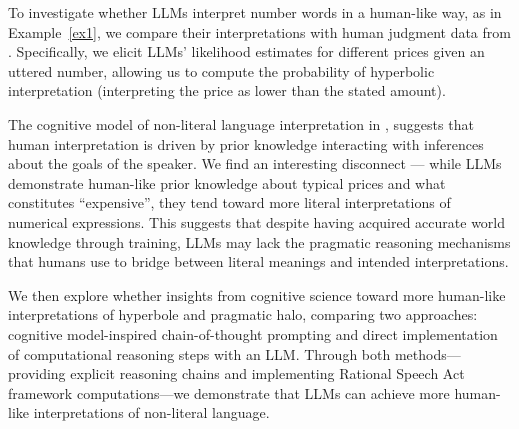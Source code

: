 To investigate whether LLMs interpret number words in a human-like way, as in Example~\ref{ex1}, we compare their  interpretations with human judgment data from \citet{kao2014nonliteral}. Specifically, we elicit LLMs' likelihood estimates for different prices given an uttered number, allowing us to compute the probability of hyperbolic interpretation (\ie interpreting the price as lower than the stated amount). 

The cognitive model of non-literal language interpretation in \citet{kao2014nonliteral}, suggests that human interpretation is driven by prior knowledge interacting with inferences about the goals of the speaker. We find an interesting disconnect --- while LLMs demonstrate human-like prior knowledge about typical prices and what constitutes ``expensive'', they tend toward more literal interpretations of numerical expressions. This suggests that despite having acquired accurate world knowledge through training, LLMs may lack the pragmatic reasoning mechanisms that humans use to bridge between literal meanings and intended interpretations. 

We then explore whether insights from cognitive science toward more human-like interpretations of hyperbole and pragmatic halo, comparing two approaches: cognitive model-inspired chain-of-thought prompting and direct implementation of computational reasoning steps with an LLM. Through both methods—providing explicit reasoning chains and implementing Rational Speech Act framework \citep{goodman2016pragmatic} computations—we demonstrate that LLMs can achieve more human-like interpretations of non-literal language.